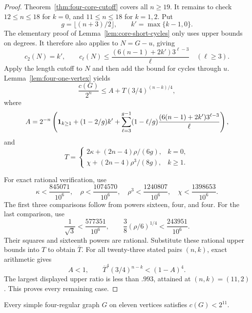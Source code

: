 \begin{proof}
Theorem~\ref{thm:four-core-cutoff} covers all $n\ge19$.
It remains to check $12\le n\le18$ for $k=0$, and $11\le n\le18$ for $k=1,2$.
Put
\[
 g=\lfloor(n+3)/2\rfloor,\qquad k'=\max\{k-1,0\}.
\]
The elementary proof of Lemma~\ref{lem:core-short-cycles} only uses upper bounds on degrees.
It therefore also applies to $N=G-u$, giving
\[
 c_2(N)=k',\qquad
 c_\ell(N)\le\frac{(6(n-1)+2k')3^{\ell-3}}\ell\quad(\ell\ge3).
\]
Apply the length cutoff to $N$ and then add the bound for cycles through $u$.
Lemma~\ref{lem:four-one-vertex} yields
\[
 \frac{c(G)}{2^n}\le A+T(3/4)^{(n-k)/4},
\]
where
\[
 A=2^{-n}\left({\bf1}_{k\ge1}+(1-2/g)k'
       +\sum_{\ell=3}^{g-1}(1-\ell/g)
          \frac{(6(n-1)+2k')3^{\ell-3}}\ell\right),
\]
and
\[
 T=\begin{cases}
 2\kappa+(2n-4)\rho/(6g),&k=0,\\
 \chi+(2n-4)\rho^3/(8g),&k\ge1.
 \end{cases}
\]

For exact rational verification, use
\[
 \kappa<\frac{845071}{10^6},\quad
 \rho<\frac{1074570}{10^6},\quad
 \rho^3<\frac{1240807}{10^6},\quad
 \chi<\frac{1398653}{10^6}.
\]
The first three comparisons follow from powers sixteen, four, and four.
For the last comparison, use
\[
 \frac1{\sqrt3}<\frac{577351}{10^6},\qquad
 \frac38(\rho/6)^{1/4}<\frac{243951}{10^6}.
\]
Their squares and sixteenth powers are rational.
Substitute these rational upper bounds into $T$ to obtain $\overline T$.
For all twenty-three stated pairs $(n,k)$, exact arithmetic gives
\[
 A<1,\qquad \overline T^4(3/4)^{n-k}<(1-A)^4.
\]
The largest displayed upper ratio is less than $.993$, attained at $(n,k)=(11,2)$.
This proves every remaining case.
\end{proof}



\begin{proposition}\label{prop:four-eleven-simple}
Every simple four-regular graph $G$ on eleven vertices satisfies $c(G)<2^{11}$.
\end{proposition}

